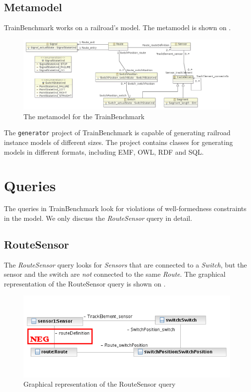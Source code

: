 \subsection{Metamodel}

TrainBenchmark works on a railroad's model. The metamodel is shown on .

\begin{figure}
\begin{center}
\includegraphics[width=14cm]{figures/TrainMetamodel}
\caption{The metamodel for the TrainBenchmark}
\label{fig:metamodel}
\end{center}
\end{figure}

The \texttt{generator} project of TrainBenchmark is capable of generating railroad instance models of different sizes. The project contains classes for generating models in different formats, including EMF, OWL, RDF and SQL.

\section{Queries}

The queries in TrainBenchmark look for violations of well-formedness constraints in the model. We only discuss the \textit{RouteSensor} query in detail.

\subsection{RouteSensor}

The \textit{RouteSensor} query looks for \textit{Sensors} that are connected to a \textit{Switch}, but the sensor and the switch are \textit{not} connected to the same \textit{Route}. The graphical representation of the RouteSensor query is shown on .

\begin{figure}
\begin{center}
\includegraphics[]{figures/OD_RouteSensor}
\caption{Graphical representation of the RouteSensor query}
\label{fig:routesensor}
\end{center}
\end{figure}

